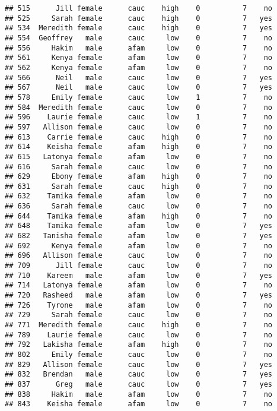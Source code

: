 \documentclass[
]{article}
\begin{document}
\begin{verbatim}
## 515      Jill female      cauc    high    0          7    no
## 525     Sarah female      cauc    high    0          7   yes
## 534  Meredith female      cauc    high    0          7   yes
## 554  Geoffrey   male      cauc     low    0          7    no
## 556     Hakim   male      afam     low    0          7    no
## 561     Kenya female      afam     low    0          7    no
## 562     Kenya female      afam     low    0          7    no
## 566      Neil   male      cauc     low    0          7   yes
## 567      Neil   male      cauc     low    0          7   yes
## 578     Emily female      cauc     low    1          7    no
## 584  Meredith female      cauc     low    0          7    no
## 596    Laurie female      cauc     low    1          7    no
## 597   Allison female      cauc     low    0          7    no
## 613    Carrie female      cauc    high    0          7    no
## 614    Keisha female      afam    high    0          7    no
## 615   Latonya female      afam     low    0          7    no
## 616     Sarah female      cauc     low    0          7    no
## 629     Ebony female      afam    high    0          7    no
## 631     Sarah female      cauc    high    0          7    no
## 632    Tamika female      afam     low    0          7    no
## 636     Sarah female      cauc     low    0          7    no
## 644    Tamika female      afam    high    0          7    no
## 648    Tamika female      afam     low    0          7   yes
## 682   Tanisha female      afam     low    0          7   yes
## 692     Kenya female      afam     low    0          7    no
## 696   Allison female      cauc     low    0          7    no
## 709      Jill female      cauc     low    0          7    no
## 710    Kareem   male      afam     low    0          7   yes
## 714   Latonya female      afam     low    0          7    no
## 720   Rasheed   male      afam     low    0          7   yes
## 726    Tyrone   male      afam     low    0          7    no
## 729     Sarah female      cauc     low    0          7    no
## 771  Meredith female      cauc    high    0          7    no
## 789    Laurie female      cauc     low    0          7    no
## 792   Lakisha female      afam    high    0          7    no
## 802     Emily female      cauc     low    0          7    no
## 829   Allison female      cauc     low    0          7   yes
## 832   Brendan   male      cauc     low    0          7   yes
## 837      Greg   male      cauc     low    0          7   yes
## 838     Hakim   male      afam     low    0          7    no
## 843    Keisha female      afam     low    0          7    no

\end{verbatim}
\end{document}
